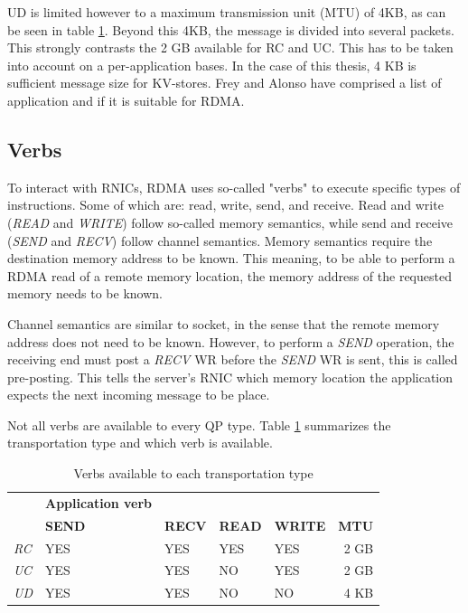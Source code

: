 UD is limited however to a maximum transmission unit (MTU) of 4KB, as can be seen in table \ref{tab:transport-verb}.
Beyond this 4KB, the message is divided into several packets.
This strongly contrasts the 2 GB available for RC and UC.
This has to be taken into account on a per-application bases.
In the case of this thesis, 4 KB is sufficient message size for KV-stores.
Frey and Alonso have comprised a list of application and if it is suitable for RDMA\cite{frey2009minimizing}.

\subsection{Verbs}\label{subsec:verbs}
To interact with RNICs, RDMA uses so-called "verbs" to execute specific types of instructions.
Some of which are: read, write, send, and receive.
Read and write (\textit{READ} and \textit{WRITE}) follow so-called memory semantics, while send and receive (\textit{SEND} and \textit{RECV}) follow channel semantics.
Memory semantics require the destination memory address to be known.
This meaning, to be able to perform a RDMA read of a remote memory location, the memory address of the requested memory needs to be known.

Channel semantics are similar to socket, in the sense that the remote memory address does not need to be known.
However, to perform a \textit{SEND} operation, the receiving end must post a \textit{RECV} WR before the \textit{SEND} WR is sent, this is called pre-posting.
This tells the server's RNIC which memory location the application expects the next incoming message to be place.

Not all verbs are available to every QP type.
Table \ref{tab:transport-verb} summarizes the transportation type and which verb is available.

\begin{table}
    \centering
    \begin{tabular}{l| p{2cm} lll|r}
        \toprule
         & \textbf{Application verb} & & & & \\
         & \textbf{SEND} & \textbf{RECV} & \textbf{READ} & \textbf{WRITE} & \textbf{MTU} \\
        \midrule
        \textit{RC} & YES & YES & YES & YES & 2 GB \\
        \textit{UC} & YES & YES & NO & YES & 2 GB \\
        \textit{UD} & YES & YES & NO & NO & 4 KB \\
        \bottomrule
    \end{tabular}
    \caption{Verbs available to each transportation type}
    \label{tab:transport-verb}
\end{table}

